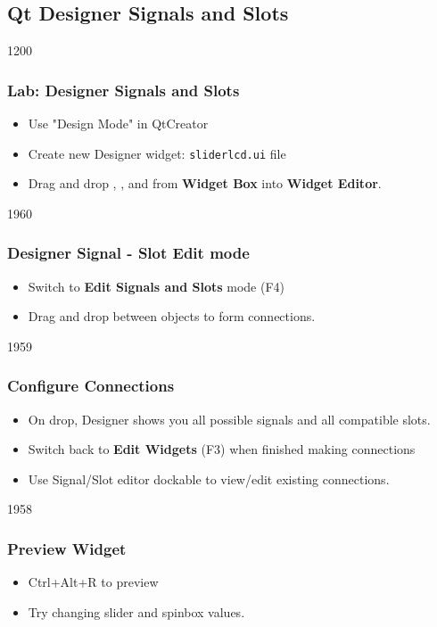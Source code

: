 \subsection{Qt Designer Signals and Slots}

\begin{slide}[fragile]{1200}
    \frametitle{Lab: Designer Signals and Slots}
\begin{itemize}
\item Use "Design Mode" in QtCreator
\item Create new Designer widget: \texttt{sliderlcd.ui} file
\item Drag and drop , , and  from \textbf{Widget Box} into \textbf{Widget Editor}.
\end{itemize}
\end{slide}

\begin{slide}[fragile]{1960}
    \frametitle{Designer Signal - Slot Edit mode}
\begin{itemize}
\item Switch to \textbf{Edit Signals and Slots} mode (F4)
\item Drag and drop between objects to form connections.
\end{itemize}

\end{slide}
\begin{slide}{1959}
\frametitle{Configure Connections}
\begin{itemize}
\item On drop, Designer shows you all possible signals and all compatible slots. 
\item Switch back to \textbf{Edit Widgets} (F3) when finished making connections
\item Use Signal/Slot editor dockable to view/edit existing connections.
\end{itemize}
\end{slide}


\begin{slide}{1958}
\frametitle{Preview Widget}
\begin{itemize}
\item  Ctrl+Alt+R to preview
\item  Try changing slider and spinbox values. 
\end{itemize}
\end{slide}


